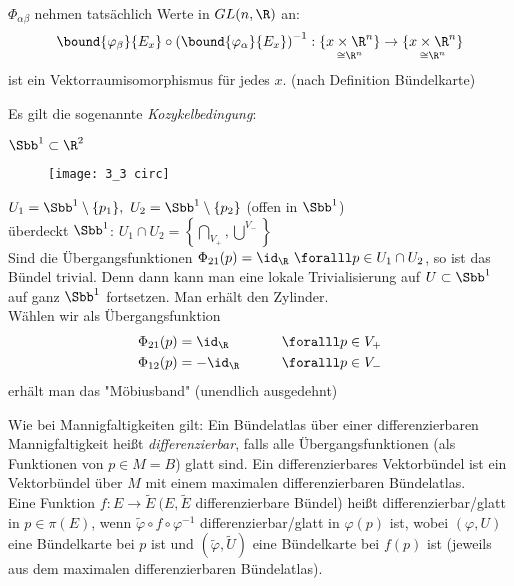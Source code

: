 \begin{rem*}
	$\Phi_{\alpha \beta}$ nehmen tatsächlich Werte in $GL(n,\R)$ an:
	$$ \bound{\varphi_\beta}{E_x} \circ \left( \bound{\varphi_\alpha}{E_x} \right)^{-1}: \underset{\cong \R^n}{\{x \times \R^n\}} \to \underset{\cong \R^n}{\{x \times \R^n\}} $$
	ist ein Vektorraumisomorphismus für jedes $x$. (nach Definition Bündelkarte)
\end{rem*}

\begin{rem*}
	Es gilt die sogenannte \emph{Kozykelbedingung}:
\end{rem*}

\begin{exmp*}
	$ \Sbb^1 \subset \R^2 $\\
	\begin{minipage}{\linewidth}
		\begin{wrapfigure}{R}{4cm}
			\centering
			\texttt{[image: 3\_3 circ]}
		\end{wrapfigure}
		$ U_1 = \Sbb^1 \setminus \{p_1\},\ U_2 = \Sbb^1 \setminus \{p_2\} $ (offen in $\Sbb^1$)\\
		überdeckt $\Sbb^1$: $ U_1 \cap U_2 = \left\{ \underset{V_+}{\bigcap}, \overset{V_-}{\bigcup} \right\} $\\
		Sind die Übergangsfunktionen $ \Phi_{21}(p) = \id_\R\ \foralll p \in U_1 \cap U_2 $, so ist das Bündel trivial. Denn dann kann man eine lokale Trivialisierung auf $ U \subset \Sbb^1 $ auf ganz $\Sbb^1$ fortsetzen. Man erhält den Zylinder.\\
		Wählen wir als Übergangsfunktion
		\begin{alignat*}{2}
			\Phi_{21}(p) &= \id_\R \qquad &&\foralll p \in V_+\\
			\Phi_{12}(p) &= -\id_\R \qquad &&\foralll p \in V_-
		\end{alignat*}
		erhält man das "Möbiusband" (unendlich ausgedehnt)
	\end{minipage}
\end{exmp*}

\begin{defn*}
	Wie bei Mannigfaltigkeiten gilt: Ein Bündelatlas über einer differenzierbaren Mannigfaltigkeit heißt \emph{differenzierbar}, falls alle Übergangsfunktionen (als Funktionen von $p \in M = B$) glatt sind. Ein differenzierbares Vektorbündel ist ein Vektorbündel über $M$ mit einem maximalen differenzierbaren Bündelatlas.\\
	Eine Funktion $ f: E \to \tilde{E}\ (E,\tilde{E}$ differenzierbare Bündel) heißt differenzierbar/glatt in $p \in \pi(E)$, wenn $ \tilde{\varphi} \circ f \circ \varphi^{-1} $ differenzierbar/glatt in $\varphi(p)$ ist, wobei $(\varphi,U)$ eine Bündelkarte bei $p$ ist und $(\tilde{\varphi},\tilde{U})$ eine Bündelkarte bei $f(p)$ ist (jeweils aus dem maximalen differenzierbaren Bündelatlas). 
\end{defn*}

